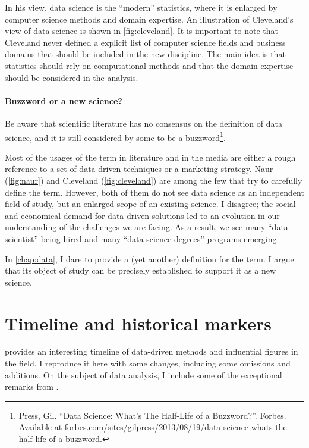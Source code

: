 In his view, data science is the ``modern'' statistics, where it is enlarged by computer
science methods and domain expertise.  An illustration of Cleveland's view of data science
is shown in \cref{fig:cleveland}.  It is important to note that Cleveland never defined a
explicit list of computer science fields and business domains that should be included in
the new discipline.  The main idea is that statistics should rely on computational methods
and that the domain expertise should be considered in the analysis.

\paragraph{Buzzword or a new science?}

Be aware that scientific literature has no consensus on the definition of data science, and it is still considered
by some to be a buzzword\footnote{Press, Gil. ``Data Science: What's The Half-Life of a
Buzzword?''. Forbes. Available at
\href{https://www.forbes.com/sites/gilpress/2013/08/19/data-science-whats-the-half-life-of-a-buzzword/}%
  {forbes.com/sites/gilpress/2013/08/19/data-science-whats-the-half-life-of-a-buzzword}.}.

Most of the usages of the term in literature and in the media are either a rough
reference to a set of data-driven techniques or a marketing strategy.  Naur
(\cref{fig:naur}) and Cleveland (\cref{fig:cleveland}) are among the few that try to
carefully define the term.  However, both of them do not see data science as an
independent field of study, but an enlarged scope of an existing science.  I disagree;
the social and economical demand for data-driven solutions led to an evolution in our
understanding of the challenges we are facing.  As a result, we see many ``data
scientist'' being hired and many ``data science degrees'' programs emerging.

In \cref{chap:data}, I dare to provide a (yet another) definition for the term.  I
argue that its object of study can be precisely established to support it as a new
science.

\section{Timeline and historical markers}

\textcite{Kelleher2018} provides an interesting timeline of data-driven methods and
influential figures in the field.  I reproduce it here with some changes, including
some omissions and additions.  On the subject of data analysis, I include some of the
exceptional remarks
from \textcite{Vapnik1999b}.

